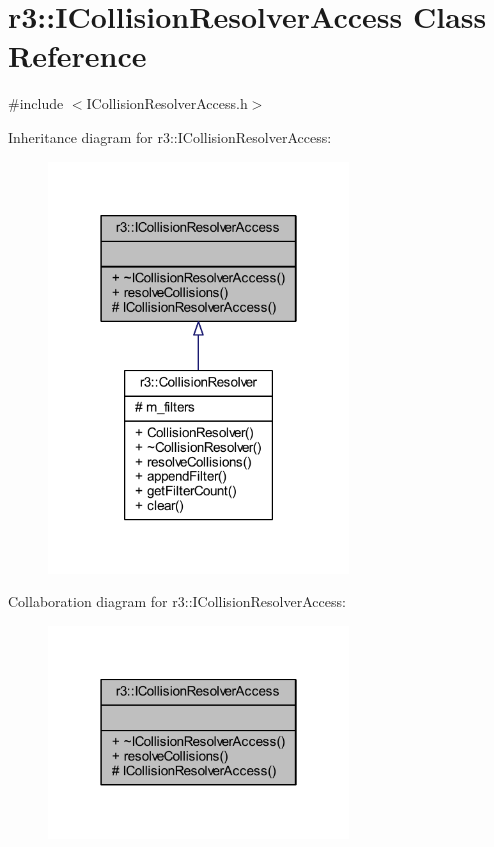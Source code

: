 \hypertarget{classr3_1_1_i_collision_resolver_access}{}\section{r3\+:\+:I\+Collision\+Resolver\+Access Class Reference}
\label{classr3_1_1_i_collision_resolver_access}


{\ttfamily \#include $<$I\+Collision\+Resolver\+Access.\+h$>$}



Inheritance diagram for r3\+:\+:I\+Collision\+Resolver\+Access\+:\nopagebreak
\begin{figure}[H]
\begin{center}
\leavevmode
\includegraphics[width=226pt]{classr3_1_1_i_collision_resolver_access__inherit__graph}
\end{center}
\end{figure}


Collaboration diagram for r3\+:\+:I\+Collision\+Resolver\+Access\+:\nopagebreak
\begin{figure}[H]
\begin{center}
\leavevmode
\includegraphics[width=226pt]{classr3_1_1_i_collision_resolver_access__coll__graph}
\end{center}
\end{figure}
